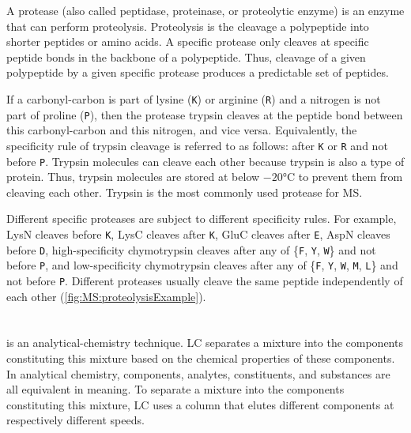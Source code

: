 A protease (also called peptidase, proteinase, or proteolytic enzyme) is an enzyme that can perform proteolysis.
Proteolysis is the cleavage a polypeptide into shorter peptides or amino acids.
A specific protease only cleaves at specific peptide bonds in the backbone of a polypeptide.
Thus, cleavage of a given polypeptide by a given specific protease produces a predictable set of peptides. 

If a carbonyl-carbon is part of lysine (\texttt{K}) or arginine (\texttt{R}) and a nitrogen is not part of proline (\texttt{P}),
	then the protease trypsin cleaves at the peptide bond between this carbonyl-carbon and this nitrogen, and vice versa. 
Equivalently, the specificity rule of trypsin cleavage is referred to as follows: after \texttt{K} or \texttt{R} and not before \texttt{P}. 
Trypsin molecules can cleave each other because trypsin is also a type of protein. 
Thus, trypsin molecules are stored at below \(-20\si{\celsius}\) to prevent them from cleaving each other.
Trypsin is the most commonly used protease for \gls{MS}.

Different specific proteases are subject to different specificity rules. 
For example, 
	LysN cleaves before \texttt{K}, 
	LysC cleaves after  \texttt{K}, 	
	GluC cleaves after  \texttt{E}, 
	AspN cleaves before \texttt{D}, 
	high-specificity chymotrypsin cleaves after any of \{\texttt{F}, \texttt{Y}, \texttt{W}\} and not before \texttt{P},
	and low-specificity chymotrypsin cleaves after any of \{\texttt{F}, \texttt{Y}, \texttt{W}, \texttt{M}, \texttt{L}\} and not before \texttt{P}. 
Different proteases usually cleave the same peptide independently of each other (\cref{fig:MS:proteolysisExample}).

\section{\texorpdfstring{}{HPLC}} 
\label{subsection_UPLC}

 is an analytical-chemistry technique.
\Gls{LC} separates a mixture into the components constituting this mixture based on the chemical properties of these components.
In analytical chemistry, components, analytes, constituents, and substances are all equivalent in meaning. %
To separate a mixture into the components constituting this mixture, \gls{LC} uses a column that elutes different components at respectively different speeds. 

